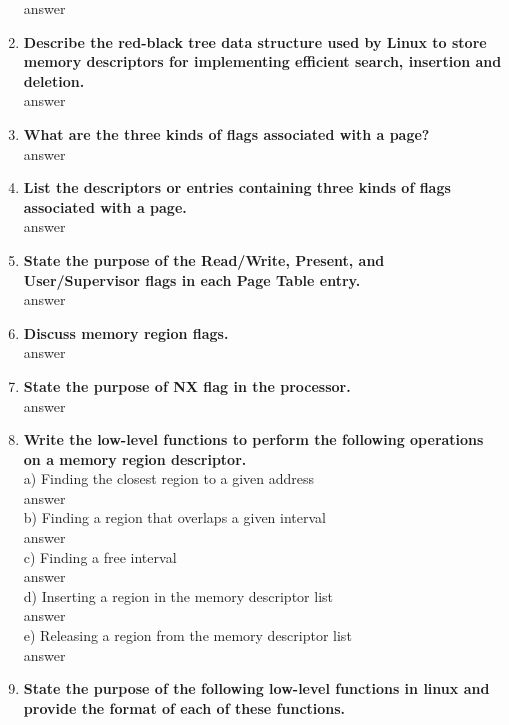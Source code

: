 \documentclass[a4paper,12pt]{article}
\begin{document}
\begin{flushleft}
\begin{enumerate}
{\color{red}answer}\\\item \textbf{ Describe the red-black tree data structure used by Linux to store memory descriptors for implementing efficient search, insertion and deletion.}\\
{\color{red}answer}\\
\item \textbf{ What are the three kinds of flags associated with a page?}\\
{\color{red}answer}\\
\item \textbf{ List the descriptors or entries containing three kinds of flags associated with a page.}\\
{\color{red}answer}\\
\item \textbf{ State the purpose of the Read/Write, Present, and User/Supervisor flags in each Page Table entry.}\\
{\color{red}answer}\\
\item \textbf{ Discuss memory region flags.}\\
{\color{red}answer}\\
\item \textbf{ State the purpose of NX flag in the processor.}\\
{\color{red}answer}\\
\item \textbf{ Write the low-level functions to perform the following operations on a memory region descriptor.}\\
a) Finding the closest region to a given address\\
{\color{red}answer}\\
b) Finding a region that overlaps a given interval\\
{\color{red}answer}\\
c) Finding a free interval\\
{\color{red}answer}\\
d) Inserting a region in the memory descriptor list\\
{\color{red}answer}\\
e) Releasing a region from the memory descriptor list\\
{\color{red}answer}\\
\item \textbf{ State the purpose of the following low-level functions in linux and provide the format of each of these functions.}\\

\end{enumerate}
\end{flushleft}
\end{document}

